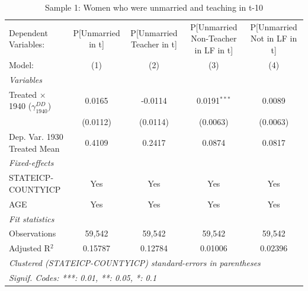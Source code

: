 
\begin{table}[htbp]
   \caption{Sample 1: Women who were unmarried and teaching in t-10}
   \centering
   \begin{tabular}{lcccc}
      \tabularnewline \midrule \midrule
      Dependent Variables:                           & P[Unmarried in t] & P[Unmarried Teacher in t] & P[Unmarried Non-Teacher in LF in t] & P[Unmarried Not in LF in t]\\  
      Model:                                         & (1)               & (2)                       & (3)                                 & (4)\\  
      \midrule
      \emph{Variables}\\
      Treated $\times$ 1940 ($\gamma_{1940}^{DD}$)   & 0.0165            & -0.0114                   & 0.0191$^{***}$                      & 0.0089\\   
                                                     & (0.0112)          & (0.0114)                  & (0.0063)                            & (0.0063)\\   
      Dep. Var. 1930 Treated Mean                    & 0.4109            & 0.2417                    & 0.0874                              & 0.0817\\  
      \midrule
      \emph{Fixed-effects}\\
      STATEICP-COUNTYICP                             & Yes               & Yes                       & Yes                                 & Yes\\  
      AGE                                            & Yes               & Yes                       & Yes                                 & Yes\\  
      \midrule
      \emph{Fit statistics}\\
      Observations                                   & 59,542            & 59,542                    & 59,542                              & 59,542\\  
      Adjusted R$^2$                                 & 0.15787           & 0.12784                   & 0.01006                             & 0.02396\\  
      \midrule \midrule
      \multicolumn{5}{l}{\emph{Clustered (STATEICP-COUNTYICP) standard-errors in parentheses}}\\
      \multicolumn{5}{l}{\emph{Signif. Codes: ***: 0.01, **: 0.05, *: 0.1}}\\
   \end{tabular}
\end{table}


